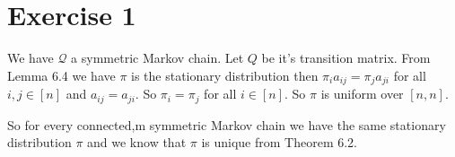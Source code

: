 \section*{Exercise 1}
We have $\mathcal{Q}$ a symmetric Markov chain.
Let $Q$ be it's transition matrix.
From Lemma 6.4 we have $\pi$ is the stationary distribution then $\pi_ia_{ij}=\pi_ja_{ji}$ for all $i,j\in \left[n\right]$ and $a_{ij}=a_{ji}$.
So $\pi_i = \pi_j$ for all $i\in[n]$.
So $\pi$ is uniform over $[n,n]$.

So for every connected,m symmetric Markov chain we have the same stationary distribution $\pi$ and we know that $\pi$ is unique from Theorem 6.2.
